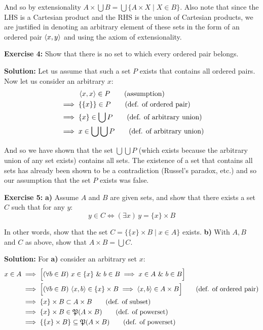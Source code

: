 \documentclass{article}
\begin{document}
And so by extensionality $A\times\bigcup B=\bigcup\{A\times X\mid X\in B\}$. Also note that since the LHS is a Cartesian product and the RHS is the union of Cartesian products, we are justified in denoting an arbitrary element of these sets in the form of an ordered pair $\langle x,y\rangle$ and using the axiom of extensionality.
\bigskip

\noindent\textbf{Exercise 4:} Show that there is no set to which every ordered pair belongs.
\bigskip

\noindent\textbf{Solution:} Let us assume that such a set $P$ exists that contains all ordered pairs. Now let us consider an arbitrary $x$:
\begin{align*}
    &\phantom{\,\,\,\,\implies}\langle x,x\rangle\in P\tag{assumption}\\
    &\implies\{\{x\}\}\in P\tag{def. of ordered pair}\\
    &\implies\{x\}\in \bigcup P\tag{def. of arbitrary union}\\
    &\implies x\in \bigcup\bigcup P\tag{def. of arbitrary union}
\end{align*}

And so we have shown that the set $\bigcup\bigcup P$ (which exists because the arbitrary union of any set exists) contains all sets. The existence of a set that contains all sets has already been shown to be a contradiction (Russel's paradox, etc.) and so our assumption that the set $P$ exists was false.

\bigskip

\noindent\textbf{Exercise 5:} \textbf{a)} Assume $A$ and $B$ are given sets, and show that there exists a set $C$ such that for any $y$:
\begin{equation*}
    y\in C\iff (\exists x)\,y=\{x\}\times B
\end{equation*}

In other words, show that the set $C=\{\{x\}\times B\mid x\in A\}$ exists. \textbf{b)} With $A,B$ and $C$ as above, show that $A\times B=\bigcup C$.
\bigskip

\noindent\textbf{Solution:} For \textbf{a)} consider an arbitrary set $x$:
\begin{align*}
    x\in A&\implies\Big[(\forall b\in B)\,\,x\in\{x\}\,\,\&\,\, b\in B\implies x\in A\,\,\&\,\, b\in B\Big]\\
    &\implies\Big[(\forall b\in B)\,\,\langle x,b\rangle\in \{x\}\times B\implies\langle x,b\rangle\in A\times B\Big]\tag{def. of ordered pair}\\
    &\implies\{x\}\times B\subset A\times B\tag{def. of subset}\\
    &\implies\{x\}\times B\in \mathfrak P(A\times B)\tag{def. of powerset}\\
    &\implies\{\{x\}\times B\}\subseteq \mathfrak P(A\times B)\tag{def. of powerset}\\
\end{align*}
\end{document}
